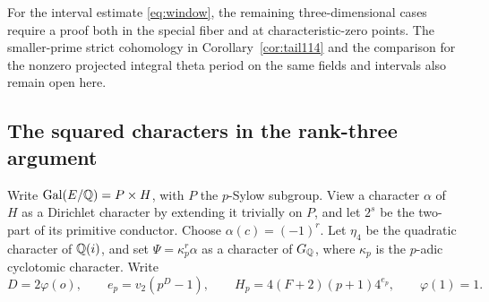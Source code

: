\documentclass[a4paper,11pt]{article}
\theoremstyle{definition}
\theoremstyle{remark}
\numberwithin{equation}{section}
\begin{document}
For the interval estimate \eqref{eq:window}, the remaining
three-dimensional cases require a proof both in the special
fiber and at characteristic-zero points. The smaller-prime
strict cohomology in Corollary~\ref{cor:tail114} and the
comparison for the nonzero projected integral theta period
on the same fields and intervals also remain open here.

\subsection{The squared characters in the rank-three argument}\label{nav:IV-28}
Write \(\operatorname{Gal}(E/\mathbb Q)=P\times H\), with \(P\) the \(p\)-Sylow
subgroup. View a character \(\alpha\) of \(H\) as a Dirichlet
character by extending it trivially on \(P\), and let \(2^s\)
be the two-part of its primitive conductor. Choose
\(\alpha(c)=(-1)^r\). Let \(\eta_4\) be the quadratic character
of \(\mathbb Q(i)\), and set \(\Psi=\kappa_p^r\alpha\) as a
character of \(G_\mathbb Q\), where \(\kappa_p\) is the \(p\)-adic
cyclotomic character. Write
\[
 D=2\varphi(o),\qquad e_p=v_2(p^D-1),\qquad
 H_p=4(F+2)(p+1)4^{e_p},\qquad \varphi(1)=1 .
\]
\end{document}
